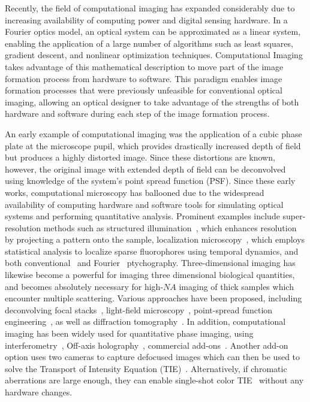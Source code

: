 Recently, the field of computational imaging has expanded considerably due to increasing availability of computing power and digital sensing hardware. In a Fourier optics model, an optical system can be approximated as a linear system, enabling the application of a large number of algorithms such as least squares, gradient descent, and nonlinear optimization techniques. Computational Imaging takes advantage of this mathematical description to move part of the image formation process from hardware to software. This paradigm enables image formation processes that were previously unfeasible for conventional optical imaging, allowing an optical designer to take advantage of the strengths of both hardware and software during each step of the image formation process. 

An early example of computational imaging was the application of a cubic phase plate at the microscope pupil, which provides drastically increased depth of field but produces a highly distorted image. Since these distortions are known, however, the original image with extended depth of field can be deconvolved using knowledge of the system's point spread function (PSF)\cite{Dowski:95}. Since these early works, computational microscopy has ballooned due to the widespread availability of computing hardware and software tools for simulating optical systems and performing quantitative analysis. Prominent examples include super-resolution methods such as structured illumination~\cite{gustafsson2000surpassing, gustafsson2005nonlinear}, which enhances resolution by projecting a pattern onto the sample, localization microscopy~\cite{betzig2006imaging, Rust:06}, which employs statistical analysis to localize sparse fluorophores using temporal dynamics, and both conventional~\cite{rodenburg2004phase} and Fourier~\cite{Zheng2013} ptychography. Three-dimensional imaging has likewise become a powerful for imaging three dimensional biological quantities, and becomes absolutely necessary for high-$NA$ imaging of thick samples which encounter multiple scattering. Various approaches have been proposed, including deconvolving focal stacks~\cite{agard1984optical}, light-field microscopy~\cite{broxton2013wave, Ng2005}, point-spread function engineering~\cite{pavani2008three}, as well as diffraction tomography~\cite{wolf1969three, kim2014diffraction, maleki1992tomographic}. In addition, computational imaging has been widely used for quantitative phase imaging, using interferometry~\cite{Popescu:06,kim2014diffraction, Bhaduri:12}, Off-axis holography~\cite{Witte:12}, commercial add-ons~\cite{phasics,bon2012method}. Another add-on option uses two cameras to capture defocused images which can then be used to solve the Transport of Intensity Equation (TIE)~\cite{allman2005optical}. Alternatively, if chromatic aberrations are large enough, they can enable single-shot color TIE~\cite{wallerColorTIE} without any hardware changes. 

